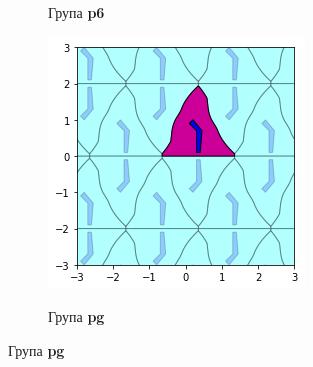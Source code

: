 \documentclass[12pt]{article}
\begin{document}
\begin{samepage}
\begin{figure}[H]
\begin{subfigure}[b]{0.3\textwidth}
    \label{fig:f21}
    \caption{Група \textbf{p6}}
  \end{subfigure}
  \begin{subfigure}[b]{0.3\textwidth}
    \includegraphics[width=\textwidth]{output_21_10.png}
    \label{fig:f24}
    \caption{Група \textbf{pg}}
  \end{subfigure}


\end{figure}
\end{samepage}
\end{document}
